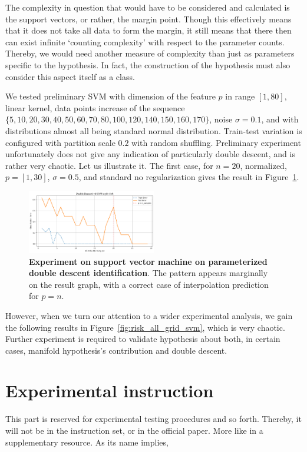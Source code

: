 \documentclass[10pt]{article}
\begin{document}
The complexity in question that would have to be considered and calculated is the support vectors, or rather, the margin point. Though this effectively means that it does not take all data to form the margin, it still means that there then can exist infinite `counting complexity' with respect to the parameter counts. Thereby, we would need another measure of complexity than just as parameters specific to the hypothesis. In fact, the construction of the hypothesis must also consider this aspect itself as a class. 

We tested preliminary SVM with dimension of the feature $p$ in range $[1,80]$, linear kernel, data points increase of the sequence $\{5, 10, 20, 30, 40 , 50, 60, 70 , 80, 100, 120, 140, 150, 160, 170\}$, noise $\sigma = 0.1$, and with distributions almost all being standard normal distribution. Train-test variation is configured with partition scale $0.2$ with random shuffling. Preliminary experiment unfortunately does not give any indication of particularly double descent, and is rather very chaotic. Let us illustrate it. The first case, for $n=20$, normalized, $p=[1,30]$, $\sigma =0.5$, and standard no regularization gives the result in Figure~\ref{fig:test_svm_com_ideal}.

\begin{figure}[htb]
  \centering
  \includegraphics[width=0.5\textwidth]{test_case_ideal_svm.png}
  \caption{\textbf{Experiment on support vector machine on parameterized double descent identification}. The pattern appears marginally on the result graph, with a correct case of interpolation prediction for $p=n$.}
  \label{fig:test_svm_com_ideal}
\end{figure}
However, when we turn our attention to a wider experimental analysis, we gain the following results in Figure~\ref{fig:risk_all_grid_svm}, which is very chaotic. Further experiment is required to validate hypothesis about both, in certain cases, manifold hypothesis's contribution and double descent. 

\clearpage

\section{Experimental instruction}
This part is reserved for experimental testing procedures and so forth. Thereby, it will not be in the instruction set, or in the official paper. More like in a supplementary resource. As its name implies, 
\end{document}
